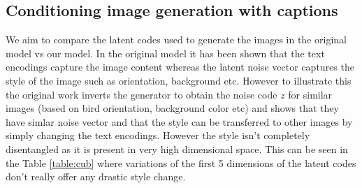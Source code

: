 \documentclass{article}
\begin{document}
\subsection{Conditioning image generation with captions}
We aim to compare the latent codes used to generate the images in the original
model vs our model. In the original model it has been shown that the text
encodings capture the image content whereas the latent noise vector captures the
style of the image such as orientation, background etc. However to illustrate
this the original work \cite{text2image} inverts the generator to obtain the
noise code $z$ for similar images (based on bird orientation, background color
etc) and shows that they have simlar noise vector and that the style can be
transferred to other images by simply changing the text encodings. However the
style isn't completely disentangled as it is present in very high dimensional
space. This can be seen in the Table \ref{table:cub} where variations of the first 5
dimensions of the latent codes don't really offer any drastic style change.
\end{document}
